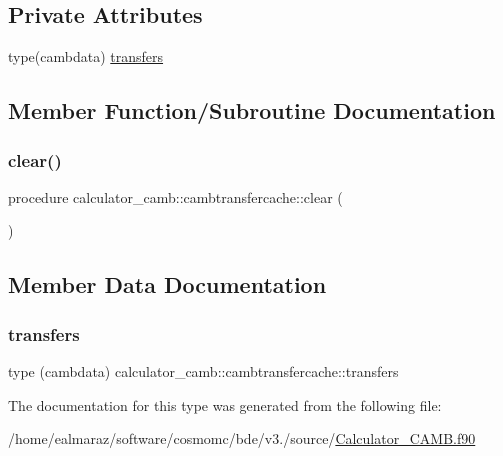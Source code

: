 \subsection*{Private Attributes}
\begin{DoxyCompactItemize}
\item 
type(cambdata) \mbox{\hyperlink{structcalculator__camb_1_1cambtransfercache_a63d2dedd652b4bd2d9a950ce12e2e4d6}{transfers}}
\end{DoxyCompactItemize}


\subsection{Member Function/\+Subroutine Documentation}
\mbox{\label{structcalculator__camb_1_1cambtransfercache_a39eb7240d0ac81b29faf7c27776b0b0c}} 
\subsubsection{\texorpdfstring{clear()}{clear()}}
{\footnotesize\ttfamily procedure calculator\+\_\+camb\+::cambtransfercache\+::clear (\begin{DoxyParamCaption}{ }\end{DoxyParamCaption})\hspace{0.3cm}{\ttfamily [private]}}



\subsection{Member Data Documentation}
\mbox{\label{structcalculator__camb_1_1cambtransfercache_a63d2dedd652b4bd2d9a950ce12e2e4d6}} 
\subsubsection{\texorpdfstring{transfers}{transfers}}
{\footnotesize\ttfamily type (cambdata) calculator\+\_\+camb\+::cambtransfercache\+::transfers\hspace{0.3cm}{\ttfamily [private]}}



The documentation for this type was generated from the following file\+:\begin{DoxyCompactItemize}
\item 
/home/ealmaraz/software/cosmomc/bde/v3./source/\mbox{\hyperlink{Calculator__CAMB_8f90}{Calculator\+\_\+\+C\+A\+M\+B.\+f90}}\end{DoxyCompactItemize}
